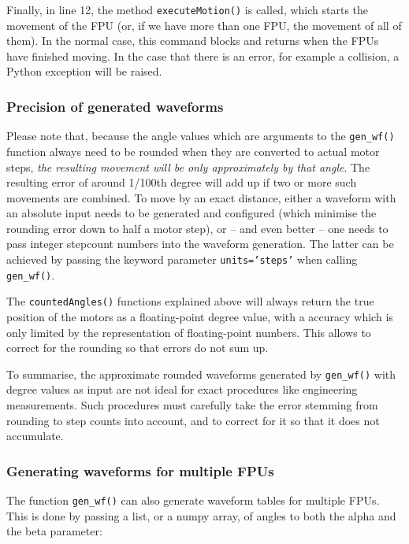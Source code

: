 \documentclass[11pt,a4paper]{scrartcl}
\begin{document}
Finally, in line 12, the method \texttt{executeMotion()} is called,
which starts the movement of the FPU (or, if we have more than one
FPU, the movement of all of them). In the normal case, this command
blocks and returns when the FPUs have finished moving.  In the case
that there is an error, for example a collision, a Python exception
will be raised.

\subsubsection{Precision of generated waveforms}

%
Please note that, because the angle values which are arguments to the
\texttt{gen\_wf()} function always need to be rounded when they are
converted to actual motor steps, \emph{the resulting movement will be
  only approximately by that angle}. The resulting error of around
1/100th degree will add up if two or more such movements are
combined. To move by an exact distance, either a waveform with an
absolute input needs to be generated and configured (which minimise
the rounding error down to half a motor step), or -- and even better
-- one needs to pass integer stepcount numbers into the waveform
generation. The latter can be achieved by passing the keyword
parameter \texttt{units='steps'} when calling \texttt{gen\_wf()}.

The \texttt{countedAngles()} functions explained above will always
return the true position of the motors as a floating-point degree
value, with a accuracy which is only limited by the representation of
floating-point numbers. This allows to correct for the rounding so
that errors do not sum up.

To summarise, the approximate rounded waveforms generated by
\texttt{gen\_wf()} with degree values as input are not ideal for exact
procedures like engineering measurements. Such procedures must
carefully take the error stemming from rounding to step counts into
account, and to correct for it so that it does not accumulate.

\subsubsection{Generating waveforms for multiple FPUs}
The function \texttt{gen\_wf()} can also generate waveform tables for
multiple FPUs. This is done by passing a list, or a numpy array,
of angles to both the alpha and the beta parameter:
\end{document}
